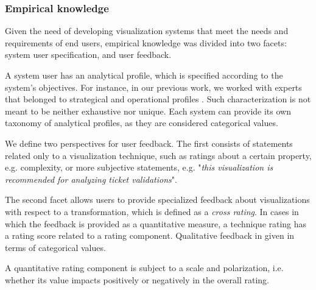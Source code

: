 \documentclass[]{interact}
\theoremstyle{plain}%
\theoremstyle{definition}
\theoremstyle{remark}
\theoremstyle{definition}
\begin{document}
%

\subsubsection{Empirical knowledge}
\label{sec:empiricalknowledge}

Given the need of developing visualization systems that meet the needs and requirements of end users, empirical knowledge was divided into two facets: system user specification, and user feedback.

A system user has an analytical profile, which is specified according to the system's objectives. For instance, in our previous work, we worked with experts that belonged to strategical and operational profiles \citep{Sobral2016b}. Such characterization is not meant to be neither exhaustive nor unique. Each system can provide its own taxonomy of analytical profiles, as they are considered categorical values.

We define two perspectives for user feedback. The first consists of statements related only to a visualization technique, such as ratings about a certain property, e.g. complexity, or more subjective statements, e.g. "\emph{this visualization is recommended for analyzing ticket validations}".

The second facet allows users to provide specialized feedback about visualizations with respect to a transformation, which is defined as a \emph{cross rating}. In cases in which the feedback is provided as a quantitative measure, a technique rating has a rating score related to a rating component. Qualitative feedback in given in terms of categorical values.

A quantitative rating component is subject to a scale and polarization, i.e. whether its value impacts positively or negatively in the overall rating.
\end{document}
